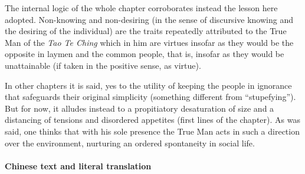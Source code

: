 The internal logic of the whole chapter corroborates instead the lesson here adopted. Non-knowing and non-desiring (in the sense of discursive knowing and the desiring of the individual) are the traits repeatedly attributed to the True Man of the \emph{Tao Te Ching} which in him are virtues insofar as they would be the opposite in laymen and the common people, that is, insofar as they would be unattainable (if taken in the positive sense, as virtue).

In other chapters it is said, yes to the utility of keeping the people in ignorance that safeguards their original simplicity (something different from ``stupefying''). But for now, it alludes instead to a propitiatory desaturation of size and a distancing of tensions and disordered appetites (first lines of the chapter). As was said, one thinks that with his sole presence the True Man acts in such a direction over the environment, nurturing an ordered spontaneity in social life.

\paragraph{Chinese text and literal translation}


